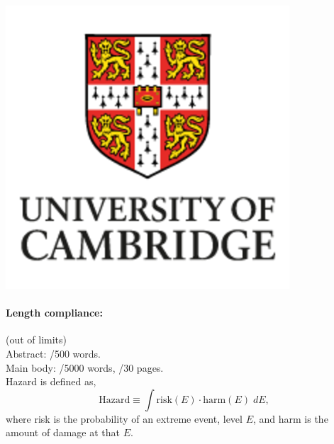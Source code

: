 \documentclass[../main.tex]{subfiles}
\begin{document}
\begin{titlepage}
\begin{center}
       \vspace{0.4cm}


       \vspace{0.3cm}


       \includegraphics[width=0.1\linewidth]{images/logos/UC.png}
       \vspace{0.8cm}
   \end{center}
\end{titlepage}

\newpage
  {
  \vspace{-50pt}
  }

  \tableofcontents

  \paragraph{Length compliance:}

  (out of limits) \\
  Abstract:  \abwords/500 words. \\
  Main body: \words/5000 words, \pages/30 pages.\\



 
 Hazard is defined as,
 \begin{equation*}
 \mathrm{Hazard}\equiv \int \mathrm{risk}(E)  \cdot \mathrm{harm}(E)\; dE,
 \end{equation*}
 where risk is the probability of an extreme event, level $E$,
 and harm is the amount of damage at that $E$.
  \thispagestyle{empty}

\newpage
\end{document}

